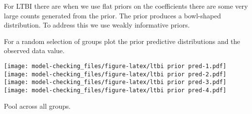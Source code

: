 \documentclass[]{article}
\newenvironment{Shaded}{\begin{snugshade}}{\end{snugshade}}
\newcommand{\ControlFlowTok}[1]{\textcolor[rgb]{0.13,0.29,0.53}{\textbf{#1}}}
\newcommand{\DataTypeTok}[1]{\textcolor[rgb]{0.13,0.29,0.53}{#1}}
\newcommand{\DecValTok}[1]{\textcolor[rgb]{0.00,0.00,0.81}{#1}}
\newcommand{\KeywordTok}[1]{\textcolor[rgb]{0.13,0.29,0.53}{\textbf{#1}}}
\newcommand{\NormalTok}[1]{#1}
\newcommand{\OperatorTok}[1]{\textcolor[rgb]{0.81,0.36,0.00}{\textbf{#1}}}
\newcommand{\StringTok}[1]{\textcolor[rgb]{0.31,0.60,0.02}{#1}}
\begin{document}
For LTBI there are when we use flat priors on the coefficients there are
some very large counts generated from the prior. The prior produces a
bowl-shaped distribution. To address this we use weakly informative
priors.

For a random selection of groups plot the prior predictive distributions
and the observed data value.

\begin{Shaded}
\end{Shaded}

\texttt{[image: model-checking\_files/figure-latex/ltbi prior pred-1.pdf]}
\texttt{[image: model-checking\_files/figure-latex/ltbi prior pred-2.pdf]}
\texttt{[image: model-checking\_files/figure-latex/ltbi prior pred-3.pdf]}
\texttt{[image: model-checking\_files/figure-latex/ltbi prior pred-4.pdf]}

Pool across all groups.
\end{document}
